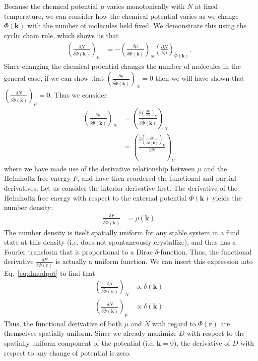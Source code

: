 \documentclass[twoside,twocolumn,9pt]{article}
\newcommand{\rvec}{\mathbf{r}}
\newcommand{\kvec}{\mathbf{k}}
\newcommand\V{\Phi}
\newcommand\Vk{\tilde\Phi(\kvec)}
\newcommand\volume{V}
\begin{document}
Because the chemical potential $\mu$ varies monotonically with $N$ at fixed
temperature, we can consider how the chemical potential varies as we change
$\Vk$ with the number of molecules held fixed. We demonstrate this using the
cyclic chain rule, which shows us that
\begin{align}
    \left(\frac{\delta N}{\delta \Vk}\right)_{\mu} &=
    -\left(\frac{\delta \mu}{\delta \Vk}\right)_{N}
    \left(\frac{\partial N}{\partial \mu}\right)_{\Vk}.
\end{align}
Since changing the chemical potential changes the number of molecules in the general case, if we can show that $\left(\frac{\delta \mu}{\delta \Vk}\right)_{N}=0$ then we will have shown that $\left(\frac{\delta N}{\delta \Vk}\right)_{\mu}=0$.  Thus we consider
\begin{align}
    \left(\frac{\delta \mu}{\delta \Vk}\right)_N
    &= \left(\frac{\delta \left(\frac{\partial F}{\partial N}\right)_{\volume}}{\delta \Vk}\right)_N
    \\
    &= \left(\frac{\partial \left(\frac{\delta F}{\delta \Vk}\right)_{\volume}}{\partial N}\right)_{\volume}
    \label{eq:dmudpot}
\end{align}
where we have made use of the derivative relationship between $\mu$ and the Helmholtz free energy $F$, and have then reordered the functional and partial derivatives.
Let us consider the interior derivative first.  The derivative of the Helmholtz free energy with respect to the external potential $\Vk$ yields the number density:
\begin{align}
    \frac{\delta F}{\delta \Vk} &= \rho(\kvec)
\end{align}
The number density is itself spatially uniform for any stable system in a fluid state at this density (i.e. does not spontaneously crystallize), and thus has a Fourier transform that is proportional to a Dirac $\delta$-function.  Thus, the functional derivative $\frac{\delta F}{\delta \V(\rvec)}$ is actually a uniform function.
We can insert this expression into Eq.~\ref{eq:dmudpot} to find that
\begin{align}
    \left(\frac{\delta \mu}{\delta \Vk}\right)_N &\propto \delta(\kvec) \\
    \left(\frac{\delta N}{\delta \Vk}\right)_\mu &\propto \delta(\kvec)
\end{align}
Thus, the functional derivative of both $\mu$ and $N$ with regard to $\V(\rvec)$ are themselves spatially uniform.  Since we already maximize $D$ with respect to the spatially uniform component of the potential (i.e. $\kvec=0$), the derivative of $D$ with respect to any change of potential is zero.
\end{document}
